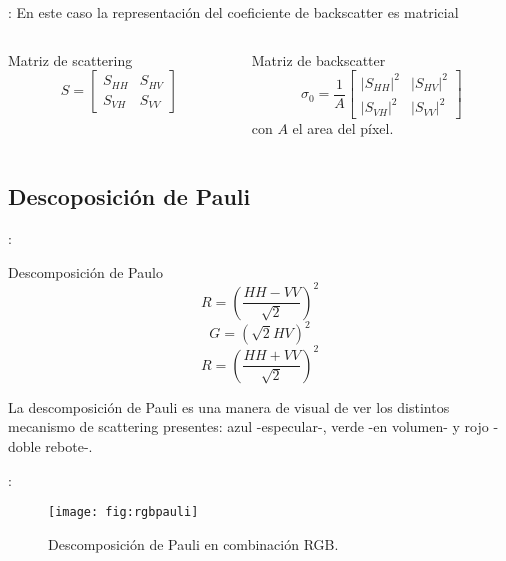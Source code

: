 \begin{frame}{\secname : \subsecname}
  En este caso la representación del coeficiente de backscatter es matricial
  \begin{columns}
    \begin{column}{0.5\textwidth}
     \begin{block}{Matriz de scattering}
      \begin{equation}
        S=
  \begin{bmatrix}
    S_{HH} & S_{HV} \\
    S_{VH} & S_{VV}
  \end{bmatrix}
      \end{equation}
     \end{block}
    \end{column}
    \begin{column}{0.5\textwidth}  %
      \begin{block}{Matriz de backscatter}
        \begin{equation}
          \sigma_0= \frac{1}{A}
  \begin{bmatrix}
    |S_{HH}|^2 & |S_{HV}|^2 \\
    |S_{VH}|^2 & |S_{VV}|^2
  \end{bmatrix}
        \end{equation}
        con $A$ el area del píxel.
      \end{block}
    \end{column}
    \end{columns}
\end{frame}

\subsection{Descoposición de Pauli}

\begin{frame}{\secname : \subsecname}
     \begin{block}{Descomposición de Paulo}
      \begin{equation}
        R = \left(\frac{HH-VV}{\sqrt{2}}\right)^2
      \end{equation}
      \begin{equation}
        G = \left(\sqrt{2}HV\right)^2
      \end{equation}
      \begin{equation}
        R = \left(\frac{HH+VV}{\sqrt{2}}\right)^2
      \end{equation}
     \end{block}
    La descomposición de Pauli es una manera de visual de ver los distintos mecanismo de scattering presentes: azul -especular-, verde -en volumen- y rojo -doble rebote-.
\end{frame}

\begin{frame}{\secname : \subsecname}
  \begin{figure}
    \centering
    \texttt{[image: fig:rgbpauli]}
    \caption{Descomposición de Pauli en combinación RGB.}
    \label{}
  \end{figure}
\end{frame}
